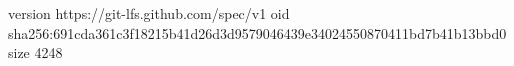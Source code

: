 version https://git-lfs.github.com/spec/v1
oid sha256:691cda361c3f18215b41d26d3d9579046439e34024550870411bd7b41b13bbd0
size 4248
